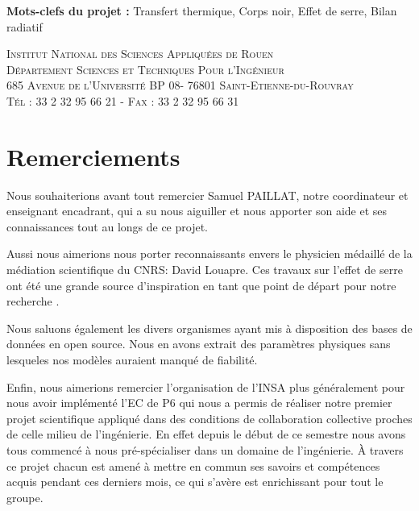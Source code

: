 \documentclass[a4paper, 12pt]{report} %
\begin{document}
\textbf{Mots-clefs du projet :} Transfert thermique, Corps noir, Effet de serre, Bilan radiatif 
\vspace{\baselineskip} 

\vfill


\begin{center}
	\scshape Institut National des Sciences Appliquées de Rouen \\
	Département Sciences et Techniques Pour l'Ingénieur \\
	685 Avenue de l'Université BP 08- 76801 Saint-Etienne-du-Rouvray \\ Tél : 33 2 32 95 66 21 - Fax : 33 2 32 95 66 31
\end{center}


\newpage
\chapter*{Remerciements} 

\setlength{\parindent}{30pt}

\indent Nous souhaiterions avant tout remercier Samuel PAILLAT, notre
coordinateur et enseignant encadrant, qui a su nous aiguiller
et nous apporter son aide et ses connaissances tout au longs
de ce projet. \vspace{\baselineskip}

	Aussi nous aimerions nous porter reconnaissants 
envers le physicien médaillé de la médiation scientifique
du CNRS: David Louapre. Ces travaux sur l'effet de serre 
ont été une grande source d'inspiration en tant que point
de départ pour notre recherche . 
\vspace{\baselineskip}

\indent Nous saluons également les divers organismes ayant 
mis à disposition des bases de données en open source. Nous
en avons extrait des paramètres physiques sans lesqueles 
nos modèles auraient manqué de fiabilité. \vspace{\baselineskip}

\indent Enfin, nous aimerions remercier l'organisation de 
l'INSA plus généralement pour nous avoir implémenté l'EC de P6
qui nous a permis de réaliser notre premier projet
scientifique appliqué dans des conditions de collaboration
collective proches de celle milieu de l'ingénierie. 
En effet depuis le début de ce semestre nous avons tous commencé à 
nous pré-spécialiser dans un domaine de l'ingénierie. À travers 
ce projet chacun est amené à mettre en commun ses savoirs et 
compétences acquis pendant ces derniers mois, ce qui s'avère est 
enrichissant pour tout le groupe.
\end{document}
